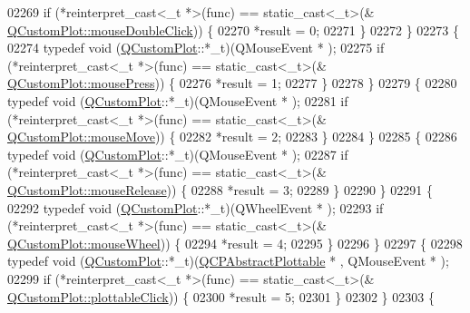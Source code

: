 \begin{DoxyCode}
02269             \textcolor{keywordflow}{if} (*reinterpret\_cast<\_t *>(func) == \textcolor{keyword}{static\_cast<}\_t\textcolor{keyword}{>}(&
      \hyperlink{a00116_a9b232142c64fcf273a953ee08e5b90e9}{QCustomPlot::mouseDoubleClick})) \{
02270                 *result = 0;
02271             \}
02272         \}
02273         \{
02274             \textcolor{keyword}{typedef} void (\hyperlink{a00030_d8/d00/a00186}{QCustomPlot}::*\_t)(QMouseEvent * );
02275             \textcolor{keywordflow}{if} (*reinterpret\_cast<\_t *>(func) == \textcolor{keyword}{static\_cast<}\_t\textcolor{keyword}{>}(&
      \hyperlink{a00116_aca75bf9afb5dd19349c375de2a87a051}{QCustomPlot::mousePress})) \{
02276                 *result = 1;
02277             \}
02278         \}
02279         \{
02280             \textcolor{keyword}{typedef} void (\hyperlink{a00030_d8/d00/a00186}{QCustomPlot}::*\_t)(QMouseEvent * );
02281             \textcolor{keywordflow}{if} (*reinterpret\_cast<\_t *>(func) == \textcolor{keyword}{static\_cast<}\_t\textcolor{keyword}{>}(&
      \hyperlink{a00116_a742ca4f94688bed2a685fd8a56ce5704}{QCustomPlot::mouseMove})) \{
02282                 *result = 2;
02283             \}
02284         \}
02285         \{
02286             \textcolor{keyword}{typedef} void (\hyperlink{a00030_d8/d00/a00186}{QCustomPlot}::*\_t)(QMouseEvent * );
02287             \textcolor{keywordflow}{if} (*reinterpret\_cast<\_t *>(func) == \textcolor{keyword}{static\_cast<}\_t\textcolor{keyword}{>}(&
      \hyperlink{a00116_ac8dc0ee6bb98e923c00b4ebafbe6134d}{QCustomPlot::mouseRelease})) \{
02288                 *result = 3;
02289             \}
02290         \}
02291         \{
02292             \textcolor{keyword}{typedef} void (\hyperlink{a00030_d8/d00/a00186}{QCustomPlot}::*\_t)(QWheelEvent * );
02293             \textcolor{keywordflow}{if} (*reinterpret\_cast<\_t *>(func) == \textcolor{keyword}{static\_cast<}\_t\textcolor{keyword}{>}(&
      \hyperlink{a00116_ac80a14206f99304a91d2aa55775ec3ff}{QCustomPlot::mouseWheel})) \{
02294                 *result = 4;
02295             \}
02296         \}
02297         \{
02298             \textcolor{keyword}{typedef} void (\hyperlink{a00030_d8/d00/a00186}{QCustomPlot}::*\_t)(\hyperlink{a00024}{QCPAbstractPlottable} * , 
      QMouseEvent * );
02299             \textcolor{keywordflow}{if} (*reinterpret\_cast<\_t *>(func) == \textcolor{keyword}{static\_cast<}\_t\textcolor{keyword}{>}(&
      \hyperlink{a00116_a57e5efa8a854620e9bf62d31fc139f53}{QCustomPlot::plottableClick})) \{
02300                 *result = 5;
02301             \}
02302         \}
02303         \{

\end{DoxyCode}
